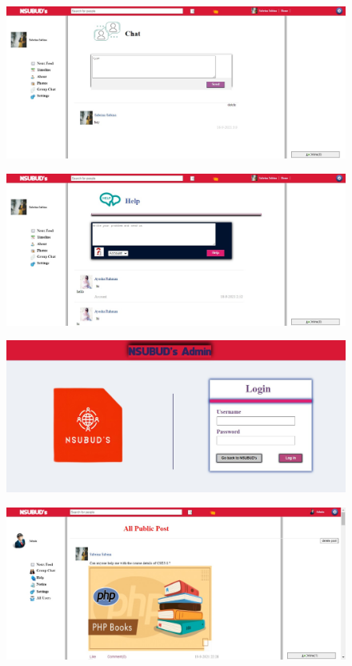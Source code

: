 {{\begin{figure}[ht]
\label{fig:graph}
\end{figure}
\begin{figure}[ht]
\includegraphics[width=18cm]{images/screenshot6png.png}
\label{fig:graph}
\end{figure}
\newpage
\begin{figure}[ht]
\includegraphics[width=18cm]{images/screenshot7.png}
\label{fig:graph}
\end{figure}
\begin{figure}[ht]
\includegraphics[width=18cm]{images/admin1.png}
\label{fig:graph}
\end{figure}
\newpage
\begin{figure}[ht]
\includegraphics[width=18cm]{images/admin2.png}

\end{figure}}}
